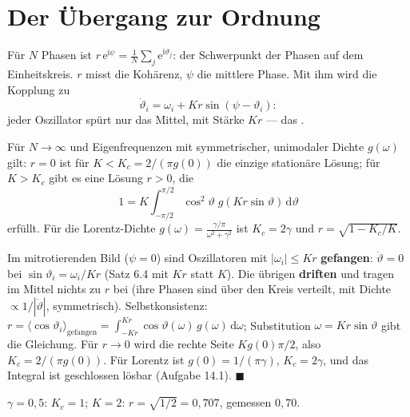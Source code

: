 \section{Der Übergang zur Ordnung}

\begin{definition}
Für $N$ Phasen ist $r\,\mathrm e^{\mathrm i\psi} = \frac1N\sum_j\mathrm e^{\mathrm i\vartheta_j}$: der Schwerpunkt der Phasen auf dem Einheitskreis. $r$ misst die Kohärenz, $\psi$ die mittlere Phase. Mit ihm wird die Kopplung zu
\[ \dot\vartheta_i = \omega_i + K r\sin(\psi - \vartheta_i) : \]
jeder Oszillator spürt nur das Mittel, mit Stärke $Kr$ --- das .
\end{definition}

\begin{merksatz}
Für $N\to\infty$ und Eigenfrequenzen mit symmetrischer, unimodaler Dichte $g(\omega)$ gilt: $r = 0$ ist für $K < K_c = 2/(\pi g(0))$ die einzige stationäre Lösung; für $K > K_c$ gibt es eine Lösung $r > 0$, die
\[ 1 = K\int_{-\pi/2}^{\pi/2}\cos^{2}\vartheta\;g(Kr\sin\vartheta)\,\mathrm d\vartheta \]
erfüllt. Für die Lorentz-Dichte $g(\omega) = \frac{\gamma/\pi}{\omega^{2}+\gamma^{2}}$ ist $K_c = 2\gamma$ und $r = \sqrt{1 - K_c/K}$.

Im mitrotierenden Bild ($\psi = 0$) sind Oszillatoren mit $|\omega_i| \le Kr$ \textbf{gefangen}: $\dot\vartheta = 0$ bei $\sin\vartheta_i = \omega_i/Kr$ (Satz 6.4 mit $K r$ statt $K$). Die übrigen \textbf{driften} und tragen im Mittel nichts zu $r$ bei (ihre Phasen sind über den Kreis verteilt, mit Dichte $\propto 1/|\dot\vartheta|$, symmetrisch). Selbstkonsistenz: $r = \langle\cos\vartheta_i\rangle_{\text{gefangen}} = \int_{-Kr}^{Kr}\cos\vartheta(\omega)\,g(\omega)\,\mathrm d\omega$; Substitution $\omega = Kr\sin\vartheta$ gibt die Gleichung. Für $r\to0$ wird die rechte Seite $K g(0)\pi/2$, also $K_c = 2/(\pi g(0))$. Für Lorentz ist $g(0) = 1/(\pi\gamma)$, $K_c = 2\gamma$, und das Integral ist geschlossen lösbar (Aufgabe 14.1). $\blacksquare$

$\gamma = 0{,}5$: $K_c = 1$; $K = 2$: $r = \sqrt{1/2} = 0{,}707$, gemessen $0{,}70$. \checkmark


\end{merksatz}
